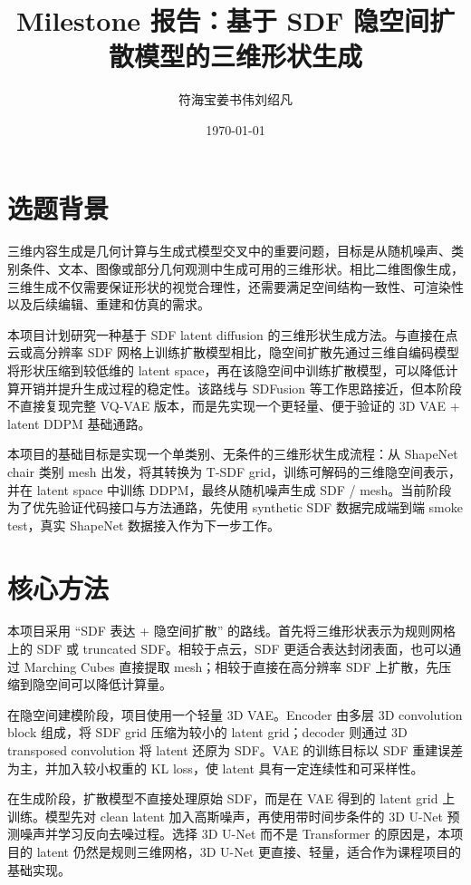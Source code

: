 \documentclass[UTF8,a4paper,12pt]{ctexart}
\title{Milestone 报告：基于 SDF 隐空间扩散模型的三维形状生成}
\author{符海宝\hspace{1cm}姜书伟\hspace{1cm}刘绍凡}
\date{\today}
\begin{document}
\maketitle

\section{选题背景}

三维内容生成是几何计算与生成式模型交叉中的重要问题，目标是从随机噪声、类别条件、文本、图像或部分几何观测中生成可用的三维形状。相比二维图像生成，三维生成不仅需要保证形状的视觉合理性，还需要满足空间结构一致性、可渲染性以及后续编辑、重建和仿真的需求。

本项目计划研究一种基于 SDF latent diffusion 的三维形状生成方法。与直接在点云或高分辨率 SDF 网格上训练扩散模型相比，隐空间扩散先通过三维自编码模型将形状压缩到较低维的 latent space，再在该隐空间中训练扩散模型，可以降低计算开销并提升生成过程的稳定性。该路线与 SDFusion 等工作思路接近，但本阶段不直接复现完整 VQ-VAE 版本，而是先实现一个更轻量、便于验证的 3D VAE + latent DDPM 基础通路。

本项目的基础目标是实现一个单类别、无条件的三维形状生成流程：从 ShapeNet chair 类别 mesh 出发，将其转换为 T-SDF grid，训练可解码的三维隐空间表示，并在 latent space 中训练 DDPM，最终从随机噪声生成 SDF / mesh。当前阶段为了优先验证代码接口与方法通路，先使用 synthetic SDF 数据完成端到端 smoke test，真实 ShapeNet 数据接入作为下一步工作。

\section{核心方法}

本项目采用 ``SDF 表达 + 隐空间扩散'' 的路线。首先将三维形状表示为规则网格上的 SDF 或 truncated SDF。相较于点云，SDF 更适合表达封闭表面，也可以通过 Marching Cubes 直接提取 mesh；相较于直接在高分辨率 SDF 上扩散，先压缩到隐空间可以降低计算量。

在隐空间建模阶段，项目使用一个轻量 3D VAE。Encoder 由多层 3D convolution block 组成，将 SDF grid 压缩为较小的 latent grid；decoder 则通过 3D transposed convolution 将 latent 还原为 SDF。VAE 的训练目标以 SDF 重建误差为主，并加入较小权重的 KL loss，使 latent 具有一定连续性和可采样性。

在生成阶段，扩散模型不直接处理原始 SDF，而是在 VAE 得到的 latent grid 上训练。模型先对 clean latent 加入高斯噪声，再使用带时间步条件的 3D U-Net 预测噪声并学习反向去噪过程。选择 3D U-Net 而不是 Transformer 的原因是，本项目的 latent 仍然是规则三维网格，3D U-Net 更直接、轻量，适合作为课程项目的基础实现。
\end{document}
